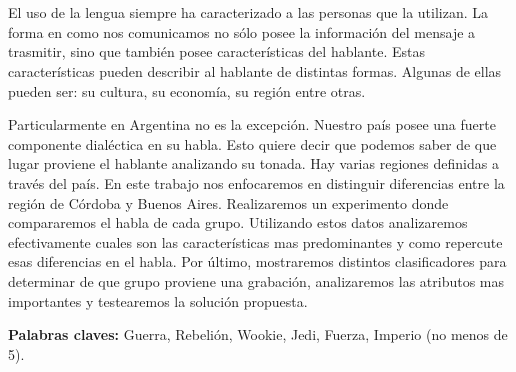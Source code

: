 \chapter*{\runtitulo}

\noindent 
El uso de la lengua siempre ha caracterizado a las personas que la utilizan. La forma en como nos comunicamos no sólo posee la información del mensaje a trasmitir, sino que también posee características del hablante. Estas características pueden describir al hablante de distintas formas. Algunas de ellas pueden ser: su cultura, su economía, su región entre otras. 

Particularmente en Argentina no es la excepción. Nuestro país posee una fuerte componente dialéctica en su habla. Esto quiere decir que podemos saber de que lugar proviene el hablante analizando su tonada. Hay varias regiones definidas a través del país. En este trabajo nos enfocaremos en distinguir diferencias entre la región de Córdoba y Buenos Aires. Realizaremos un experimento donde compararemos el habla de cada grupo. Utilizando estos datos analizaremos efectivamente cuales son las características mas predominantes y como repercute esas diferencias en el habla. Por último, mostraremos distintos clasificadores para determinar de que grupo proviene una grabación, analizaremos las atributos mas importantes y testearemos la solución propuesta. 

\bigskip

\noindent\textbf{Palabras claves:} Guerra, Rebelión, Wookie, Jedi, Fuerza, Imperio (no menos de 5).
